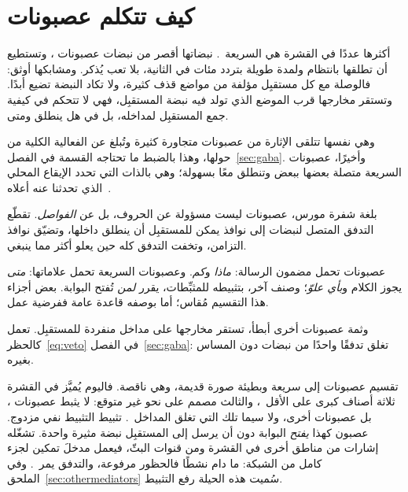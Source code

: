 \section{كيف تتكلم عصبونات }

أكثرها عددًا في القشرة هي السريعة~\cite{Tremblay2016}. نبضاتها أقصر من نبضات عصبونات ، وتستطيع أن تطلقها بانتظام ولمدة طويلة بتردد مئات في الثانية، بلا تعب يُذكر. ومشابكها أوثق: فالوصلة مع كل مستقبِل مؤلفة من مواضع قذف كثيرة، ولا تكاد النبضة تضيع أبدًا. وتستقر مخارجها قرب الموضع الذي تولد فيه نبضة المستقبِل، فهي لا تتحكم في كيفية جمع المستقبِل لمداخله، بل في هل ينطلق ومتى.

وهي نفسها تتلقى الإثارة من عصبونات  متجاورة كثيرة وتُبلغ عن الفعالية الكلية من حولها، وهذا بالضبط ما تحتاجه القسمة في الفصل~\ref{sec:gaba}. وأخيرًا، عصبونات  السريعة متصلة بعضها ببعض وتنطلق معًا بسهولة؛ وهي بالذات التي تحدد الإيقاع المحلي الذي تحدثنا عنه أعلاه~\cite{Cardin2009}.

بلغة شفرة مورس، عصبونات  ليست مسؤولة عن الحروف، بل عن \emph{الفواصل}. تقطّع التدفق المتصل لنبضات  إلى نوافذ يمكن للمستقبِل أن ينطلق داخلها، وتضيّق نوافذ التزامن، وتخفت التدفق كله حين يعلو أكثر مما ينبغي.

\begin{keyblock}
\begin{proposition}
\label{prop:punctuation}
عصبونات  تحمل مضمون الرسالة: \emph{ماذا} و\emph{كم}. وعصبونات  السريعة تحمل علاماتها: \emph{متى} يجوز الكلام و\emph{بأي علوّ}؛ وصنف آخر، بتثبيطه للمثبِّطات، يقرر \emph{لمن} تُفتح البوابة. بعض أجزاء هذا التقسيم مُقاس؛ أما بوصفه قاعدة عامة ففرضية عمل.
\end{proposition}
\end{keyblock}

وثمة عصبونات  أخرى أبطأ، تستقر مخارجها على مداخل منفردة للمستقبِل. تعمل كالحظر~\eqref{eq:veto} في الفصل~\ref{sec:gaba}: تغلق تدفقًا واحدًا من نبضات  دون المساس بغيره.

تقسيم عصبونات  إلى سريعة وبطيئة صورة قديمة، وهي ناقصة. فاليوم يُميَّز في القشرة ثلاثة أصناف كبرى على الأقل~\cite{Tremblay2016}، والثالث مصمم على نحو غير متوقع: لا يثبط عصبونات ، بل عصبونات  أخرى، ولا سيما تلك التي تغلق المداخل~\cite{Pfeffer2013}. تثبيط التثبيط نفي مزدوج. عصبون كهذا \emph{يفتح} البوابة دون أن يرسل إلى المستقبِل نبضة مثيرة واحدة. تشغّله إشارات من مناطق أخرى في القشرة ومن قنوات البثّ، فيعمل مدخلَ تمكين لجزء كامل من الشبكة: ما دام نشطًا فالحظور مرفوعة، والتدفق يمر~\cite{Pi2013}. وفي الملحق~\ref{sec:othermediators} سُميت هذه الحيلة رفع التثبيط.
